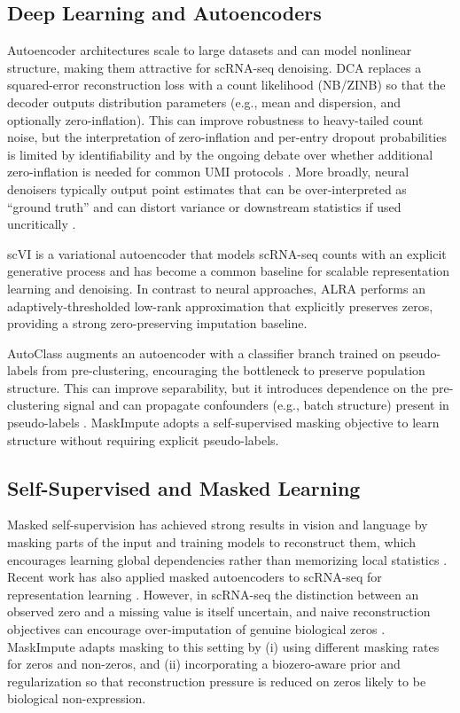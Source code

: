 \documentclass{article}
\theoremstyle{plain}
\theoremstyle{definition}
\theoremstyle{remark}
\begin{document}
\subsection{Deep Learning and Autoencoders}
Autoencoder architectures scale to large datasets and can model nonlinear
structure, making them attractive for scRNA-seq denoising. DCA
\citep{Eraslan2019DCA} replaces a squared-error reconstruction loss with a
count likelihood (NB/ZINB) so that the decoder outputs distribution parameters
(e.g., mean and dispersion, and optionally zero-inflation). This can improve
robustness to heavy-tailed count noise, but the interpretation of zero-inflation
and per-entry dropout probabilities is limited by identifiability and by the
ongoing debate over whether additional zero-inflation is needed for common UMI
protocols \citep{Svensson2020NotZeroInflated, Jiang2022ZeroInflationReview}.
More broadly, neural denoisers typically output point estimates that can be
over-interpreted as ``ground truth'' and can distort variance or downstream
statistics if used uncritically \citep{Hou2020ImputationBenchmark, Linderman2022ZeroPreserving}.

scVI \citep{Lopez2018scVI} is a variational autoencoder that models scRNA-seq
counts with an explicit generative process and has become a common baseline for
scalable representation learning and denoising. In contrast to neural
approaches, ALRA \citep{Linderman2022ALRA} performs an adaptively-thresholded
low-rank approximation that explicitly preserves zeros, providing a strong
zero-preserving imputation baseline.

AutoClass \citep{Li2022AutoClass} augments an autoencoder with a classifier
branch trained on pseudo-labels from pre-clustering, encouraging the bottleneck
to preserve population structure. This can improve separability, but it
introduces dependence on the pre-clustering signal and can propagate
confounders (e.g., batch structure) present in pseudo-labels
\citep{Hou2020ImputationBenchmark}. MaskImpute adopts a self-supervised masking
objective to learn structure without requiring explicit pseudo-labels.

\subsection{Self-Supervised and Masked Learning}
Masked self-supervision has achieved strong results in vision and language by
masking parts of the input and training models to reconstruct them, which
encourages learning global dependencies rather than memorizing local statistics
\citep{Devlin2019BERT, He2022MAE}. Recent work has also applied masked
autoencoders to scRNA-seq for representation learning
\citep{Fang2024scMAE}. However, in scRNA-seq the distinction between an
observed zero and a missing value is itself uncertain, and naive reconstruction
objectives can encourage over-imputation of genuine biological zeros
\citep{SarkarStephens2021SeparatingMeasurement, Linderman2022ZeroPreserving}.
MaskImpute adapts masking to this setting by (i) using different masking rates
for zeros and non-zeros, and (ii) incorporating a biozero-aware prior and
regularization so that reconstruction pressure is reduced on zeros likely to be
biological non-expression.
\end{document}

